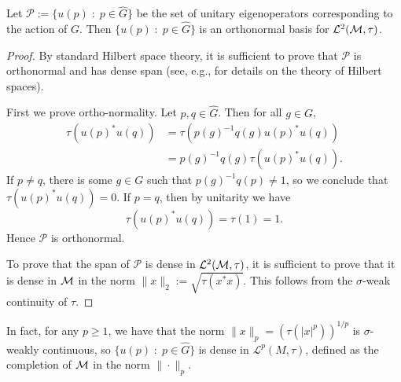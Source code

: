 \begin{proposition}
\label{L2Convergence}
    Let $\mathcal{P} := \{u(p)\;:\;p \in \widehat{G}\}$ be the set of unitary eigenoperators
    corresponding to the action of $G$. Then $\{u(p)\;:\; p \in \widehat{G}\}$
    is an orthonormal basis for $\mathcal{L}^2(\mathcal{M},\tau)$.
\end{proposition}
\begin{proof}
    By standard Hilbert space theory, it is sufficient to prove that $\mathcal{P}$
    is orthonormal and has dense span (see, e.g., \cite{rudin} for details on
    the theory of Hilbert spaces).
    
    First we prove ortho-normality. Let $p,q \in \widehat{G}$. Then for all $g \in G$,
    \begin{align}
        \tau(u(p)^*u(q)) &= \tau(p(g)^{-1}q(g)u(p)^*u(q))\\
        &= p(g)^{-1}q(g)\tau(u(p)^*u(q)).
    \end{align}
    If $p \neq q$, there is some $g \in G$ such that $p(g)^{-1}q(p) \neq 1$,
    so we conclude that $\tau(u(p)^*u(q)) = 0$.
    If $p = q$, then by unitarity we have
    \begin{equation}
        \tau(u(p)^*u(q)) = \tau(1) = 1.
    \end{equation}
    Hence $\mathcal{P}$ is orthonormal.
    
    To prove that the span of $\mathcal{P}$ is dense in $\mathcal{L}^2(\mathcal{M},\tau)$,
    it is sufficient to prove that it is dense in $\mathcal{M}$ in the norm $\|x\|_2 := \sqrt{\tau(x^*x)}$.
    This follows from the $\sigma$-weak continuity of $\tau$.
\end{proof}

\begin{remark}
    In fact, for any $p \geq 1$, we have that the norm $\|x\|_p = (\tau(|x|^p))^{1/p}$
    is $\sigma$-weakly continuous, so $\{u(p)\;:\;p \in \widehat{G}\}$
    is dense in $\mathcal{L}^p(M,\tau)$, defined as the completion of $\mathcal{M}$
    in the norm $\|\cdot\|_p$. 
\end{remark}

